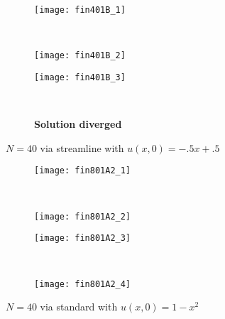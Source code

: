 \documentclass[10pt,letterpaper,fleqn]{article}
\begin{document}
\begin{figure}[h!]
        \centering
        \begin{subfigure}[b]{0.4\textwidth}
                \texttt{[image: fin401B\_1]}
        \end{subfigure}%
        ~ 
        \begin{subfigure}[b]{0.4\textwidth}
                \texttt{[image: fin401B\_2]}
        \end{subfigure}
        
        \begin{subfigure}[b]{0.4\textwidth}
                \texttt{[image: fin401B\_3]}
        \end{subfigure}
        ~
        \begin{subfigure}[b]{0.4\textwidth}
               \textbf{Solution diverged}
        \end{subfigure}
        \caption{$N = 40$ via streamline with $u(x,0) = -.5x + .5$}
\end{figure}



\begin{figure}[h!]
        \centering
        \begin{subfigure}[b]{0.4\textwidth}
                \texttt{[image: fin801A2\_1]}
        \end{subfigure}%
        ~ 
        \begin{subfigure}[b]{0.4\textwidth}
                \texttt{[image: fin801A2\_2]}
        \end{subfigure}
        
        \begin{subfigure}[b]{0.4\textwidth}
                \texttt{[image: fin801A2\_3]}
        \end{subfigure}
        ~
        \begin{subfigure}[b]{0.4\textwidth}
                \texttt{[image: fin801A2\_4]}
        \end{subfigure}
        \caption{$N = 40$ via standard with $u(x,0) = 1 - x^2$}
\end{figure}
\end{document}
